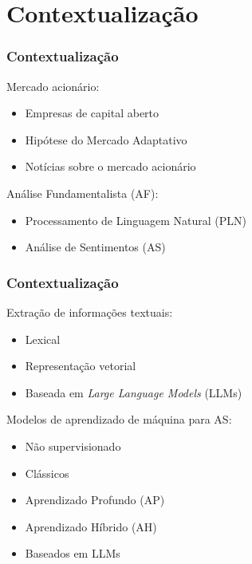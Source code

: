 \section{Contextualização} %


\begin{frame}
	\frametitle{Contextualização}
     
     Mercado acionário:
    \begin{itemize}
        \item Empresas de capital aberto
        \item Hipótese do Mercado Adaptativo
        \item Notícias sobre o mercado acionário
    \end{itemize}
    \bigskip
    Análise Fundamentalista (AF):
    \begin{itemize}
        \item Processamento de Linguagem Natural (PLN)
        \item Análise de Sentimentos (AS)
    \end{itemize}
	
\end{frame}



\begin{frame}
	\frametitle{Contextualização}
     
    Extração de informações textuais:
    \begin{itemize}
        \item Lexical
        \item Representação vetorial
        \item Baseada em \textit{Large Language Models} (LLMs)
    \end{itemize}
    \bigskip
    Modelos de aprendizado de máquina para AS:
    \begin{itemize}
        \item Não supervisionado
        \item Clássicos
        \item Aprendizado Profundo (AP)
        \item Aprendizado Híbrido (AH)
        \item Baseados em LLMs
    \end{itemize}
	
\end{frame}

